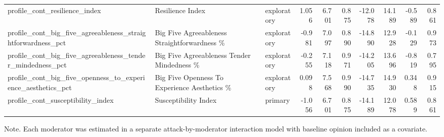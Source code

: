 \begin{table}[htbp]
{\begin{tabular}{lllrrrrrrr}
profile\_cont\_resilience\_index & Resilience Index & exploratory & 1.056 & 6.701 & 0.875 & -12.078 & 14.189 & -0.589 & 0.861 \\
profile\_cont\_big\_five\_agreeableness\_straightforwardness\_pct & Big Five Agreeableness Straightforwardness \% & exploratory & -0.981 & 7.097 & 0.890 & -14.890 & 12.928 & -0.129 & 0.973 \\
profile\_cont\_big\_five\_agreeableness\_tender\_mindedness\_pct & Big Five Agreeableness Tender Mindedness \% & exploratory & -0.255 & 7.118 & 0.971 & -14.205 & 13.696 & -0.819 & 0.795 \\
profile\_cont\_big\_five\_openness\_to\_experience\_aesthetics\_pct & Big Five Openness To Experience Aesthetics \% & exploratory & 0.098 & 7.568 & 0.990 & -14.735 & 14.930 & 0.348 & 0.915 \\
profile\_cont\_susceptibility\_index & Susceptibility Index & primary & -1.056 & 6.701 & 0.875 & -14.189 & 12.078 & 0.589 & 0.861 \\
\bottomrule
\end{tabular}
}
\par\smallskip
{\normalsize Note. Each moderator was estimated in a separate attack-by-moderator interaction model with baseline opinion included as a covariate.}
\end{table}